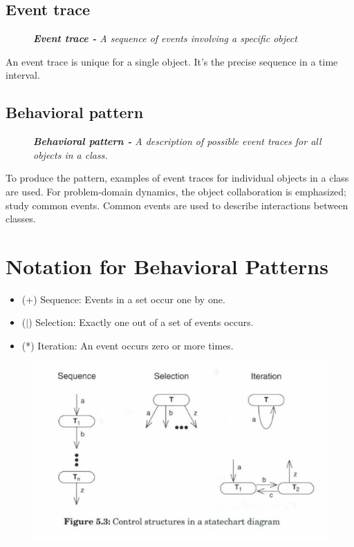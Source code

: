 \subsection*{Event trace \ooad[92]}
\begin{figure}[H]
    \textit{\textbf{Event trace -} A sequence of events involving a specific object}
\end{figure}

An event trace is unique for a single object. It's the precise sequence in a time interval.

\subsection*{Behavioral pattern \ooad[92]}
\begin{figure}[H]
    \textit{\textbf{Behavioral pattern -} A description of possible event traces for all objects in a class.}
\end{figure}
To produce the pattern, examples of event traces for individual objects in a class are used. For problem-domain dynamics, the object collaboration is emphasized; study common events. Common events are used to describe interactions between classes.

\section{Notation for Behavioral Patterns}
\begin{itemize}
    \item (+) Sequence: Events in a set occur one by one.
    \item ($\vert$) Selection: Exactly one out of a set of events occurs.
    \item (*) Iteration: An event occurs zero or more times.
\end{itemize}

\begin{figure}[H]
    \centering
    \includegraphics[width=\linewidth]{chapters/behavior/figures/statechart.png}
\end{figure}

